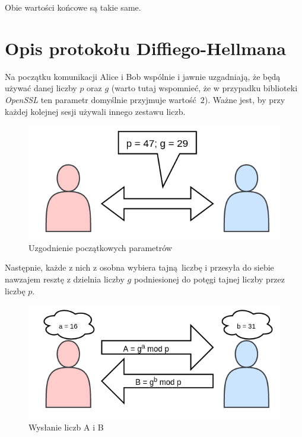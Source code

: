 \documentclass[12pt]{article}
\begin{document}
Obie wartości końcowe są takie same.

\section{Opis protokołu Diffiego-Hellmana}

Na początku komunikacji Alice i Bob wspólnie i jawnie uzgadniają, że będą używać danej liczby $p$ oraz $g$ (warto tutaj wspomnieć, że w przypadku biblioteki \textit{OpenSSL} ten parametr domyślnie przyjmuje wartość $2$).
Ważne jest, by przy każdej kolejnej sesji używali innego zestawu liczb.

\begin{figure}[h!]
	\begin{center}
		\includegraphics[scale=0.3]{4-dh-diagram-1}
	\end{center}
	\caption{Uzgodnienie początkowych parametrów}
\end{figure}

Następnie, każde z nich z osobna wybiera tajną liczbę i przesyła do siebie nawzajem resztę z dzielnia liczby $g$ podniesionej do potęgi tajnej liczby przez liczbę $p$.

\begin{figure}[h!]
	\begin{center}
		\includegraphics[scale=0.3]{4-dh-diagram-2}
	\end{center}
	\caption{Wysłanie liczb A i B}
\end{figure}
\end{document}
